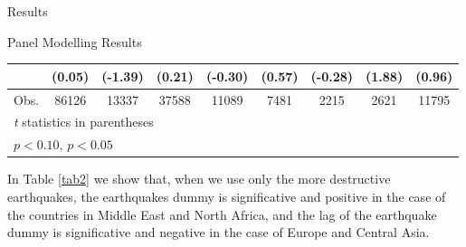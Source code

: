 \documentclass[12.5pt,fleqn,leqno,letterpaper]{article}
\begin{document}
\begin{section}{Results}
\begin{subsection}{Panel Modelling Results}
\begin{table}[H]
{\begin{tabular}{l*{8}{c}}
                               &      (0.05)        &     (-1.39)        &      (0.21)        &     (-0.30)        &      (0.57)        &     (-0.28)        &      (1.88)        &      (0.96)        \\
          \hline
          Obs.        &       86126        &       13337        &       37588        &       11089        &        7481        &        2215        &        2621        &       11795        \\
          \hline\hline
          \multicolumn{9}{l}{\footnotesize \textit{t} statistics in parentheses}\\
          \multicolumn{9}{l}{\footnotesize \sym{*} \(p<0.10\), \sym{**} \(p<0.05\)}\\
      \end{tabular}}
    \end{table}

    In Table \ref{tab2} we show that, when we use only the more destructive earthquakes, the earthquakes dummy is significative and positive in the case of the countries in Middle East and North Africa, and the lag of the earthquake dummy is significative and negative in the case of Europe and Central Asia.


\end{subsection}
\end{section}
\end{document}
